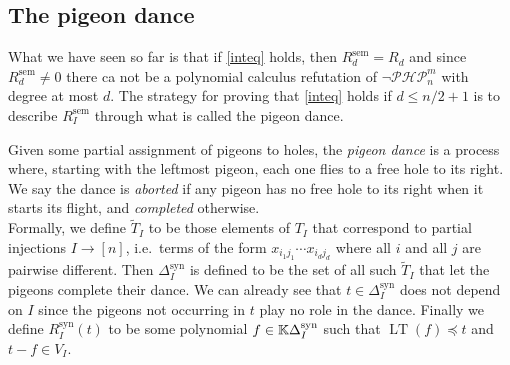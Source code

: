 \documentclass{article}
\newcommand{\PHP}{\ensuremath{\neg \mathcal{PHP}^m_n}\xspace}
\newcommand{\LT}{\operatorname{LT}}
\newcommand{\Rsem}{R^\mathrm{sem}}
\newcommand{\Rsyn}{R^\mathrm{syn}}
\newcommand{\Dsyn}{\Delta^\mathrm{syn}}
\begin{document}
\subsection{The pigeon dance}
What we have seen so far is that if \eqref{inteq} holds, then $\Rsem_d = R_d$ and since $\Rsem_d \neq 0$ there ca not be a polynomial calculus refutation of \PHP with degree at most $d$. The strategy for proving that \eqref{inteq} holds if $d \leq n / 2 + 1$ is to describe $\Rsem_I$ through what is called the pigeon dance.

Given some partial assignment of pigeons to holes, the \textit{pigeon dance} is a process where, starting with the leftmost pigeon, each one flies to a free hole to its right. We say the dance is \textit{aborted} if any pigeon has no free hole to its right when it starts its flight, and \textit{completed} otherwise.\\
Formally, we define $\tilde T_I$ to be those elements of $T_I$ that correspond to partial injections $I \to [n]$, i.e.\ terms of the form $x_{i_1 j_1} \cdots x_{i_d j_d}$ where all $i$ and all $j$ are pairwise different. Then $\Dsyn_I$ is defined to be the set of all such $\tilde T_I$ that let the pigeons complete their dance. We can already see that $t \in \Dsyn_I$ does not depend on $I$ since the pigeons not occurring in $t$ play no role in the dance. Finally we define $\Rsyn_I(t)$ to be some polynomial $f \in \KK \Dsyn_I$ such that $\LT(f) \preceq t$ and $t - f \in V_I$.
\end{document}
